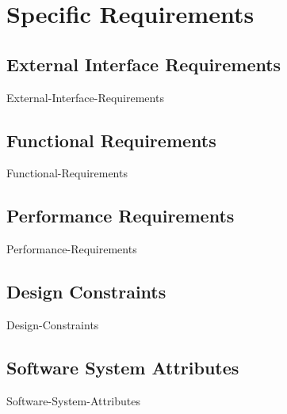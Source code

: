 \section{Specific Requirements}

\subsection{External Interface Requirements}
{External-Interface-Requirements}
		

\subsection{Functional Requirements}
{Functional-Requirements}


\subsection{Performance	Requirements}
{Performance-Requirements}	

\subsection{Design Constraints}
{Design-Constraints}

		
\subsection{Software System Attributes}
{Software-System-Attributes}
